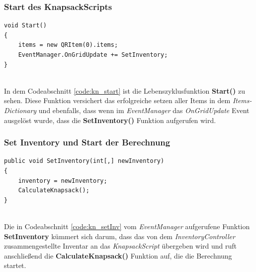 \subsubsection{Start des KnapsackScripts}
\begin{lstlisting}[style=csharp, caption={Start Funktion des KnapsackScripts}, label=code:kn_start]
void Start()
{
    items = new QRItem(0).items;
    EventManager.OnGridUpdate += SetInventory;
}
\end{lstlisting}\\
In dem Codeabschnitt \ref{code:kn_start} ist die Lebenszyklusfunktion \textbf{Start()} zu sehen. Diese Funktion versichert
das erfolgreiche setzen aller Items in dem \textit{Items-Dictionary} und ebenfalls, dass wenn im \textit{EventManager}
das \textit{OnGridUpdate} Event ausgelöst wurde, dass die \textbf{SetInventory()} Funktion aufgerufen wird.

\subsubsection{Set Inventory und Start der Berechnung}
\begin{lstlisting}[style=csharp, caption={Setzen des Inventars und starten der Berechnung}, label=code:kn_setInv]
public void SetInventory(int[,] newInventory)
{
    inventory = newInventory;
    CalculateKnapsack();
}
\end{lstlisting}\\
Die in Codeabschnitt \ref{code:kn_setInv} vom \textit{EventManager} aufgerufene Funktion \textbf{SetInventory}
kümmert sich darum, dass das von dem \textit{InventoryController} zusammengestellte Inventar an das \textit{KnapsackScript}
übergeben wird und ruft anschließend die \textbf{CalculateKnapsack()} Funktion auf, die die Berechnung startet.

